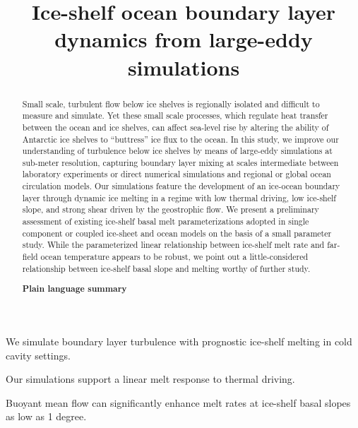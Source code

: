\documentclass[draft]{agujournal2019}
\begin{document}
\title{Ice-shelf ocean boundary layer dynamics from large-eddy simulations}

	

\begin{keypoints}
\item We simulate boundary layer turbulence with prognostic ice-shelf melting
in cold cavity settings.
\item Our simulations support a linear melt response to thermal driving.
\item Buoyant mean flow can significantly enhance melt rates at ice-shelf basal slopes as low as 1 degree.
\end{keypoints}

\begin{abstract}
Small scale, turbulent flow below ice shelves is regionally isolated and difficult to measure and simulate.  Yet these small scale processes, which regulate heat transfer between the ocean and ice shelves, can affect sea-level rise by altering the ability of Antarctic ice shelves to “buttress” ice flux to the ocean. 
In this study, we improve our understanding of turbulence below ice shelves by means of large-eddy simulations at sub-meter resolution, capturing boundary layer mixing at scales intermediate between laboratory experiments or direct numerical simulations and regional or global ocean circulation models. 
Our simulations feature the development of an ice-ocean boundary layer through dynamic ice melting in a regime with low thermal driving, low ice-shelf slope, and strong shear driven by the geostrophic flow. 
We present a preliminary assessment of existing ice-shelf basal melt parameterizations adopted in single component or coupled ice-sheet and ocean models on the basis of a small parameter study. While the parameterized linear relationship between ice-shelf melt rate and far-field ocean temperature appears to be robust, we point out a little-considered relationship between ice-shelf basal slope and melting worthy of further study.

\textbf{Plain language summary}\\
    
\end{abstract}
\newpage
\end{document}
